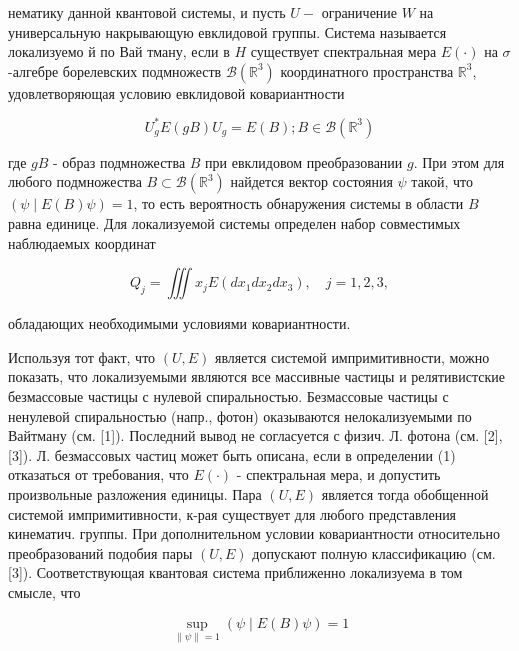 \documentclass[10pt]{article}
\begin{document}
нематику данной квантовой системы, и пусть $U-$ ограничение $W$ на универсальную накрывающую евклидовой группы. Система называется локализуемо й по Вай тману, если в $H$ существует спектральная мера $E(\cdot)$ на $\sigma$-алгебре борелевских подмножеств $\mathscr{B}\left(\mathbb{R}^{3}\right)$ координатного пространства $\mathbb{R}^{3}$, удовлетворяющая условию евклидовой ковариантности



\[

U_{g}^{*} E(g B) U_{g}=E(B) ; B \in \mathscr{B}\left(\mathbb{R}^{3}\right)

\]



где $g B$ - образ подмножества $B$ при евклидовом преобразовании $g$. При этом для любого подмножества $B \subset \mathscr{B}\left(\mathbb{R}^{3}\right)$ найдется вектор состояния $\psi$ такой, что $(\psi \mid E(B) \psi)=1$, то есть вероятность обнаружения системы в области $B$ равна единице. Для локализуемой системы определен набор совместимых наблюдаемых координат



\[

Q_{j}=\iiint x_{j} E\left(d x_{1} d x_{2} d x_{3}\right), \quad j=1,2,3,

\]



обладающих необходимыми условиями ковариантности.



Используя тот факт, что $(U, E)$ является системой импримитивности, можно показать, что локализуемыми являются все массивные частицы и релятивистские безмассовые частицы с нулевой спиральностью. Безмассовые частицы с ненулевой спиральностью (напр., фотон) оказываются нелокализуемыми по Вайтману (см. [1]). Последний вывод не согласуется с физич. Л. фотона (см. [2], [3]). Л. безмассовых частиц может быть описана, если в определении (1) отказаться от требования, что $E(\cdot)$ - спектральная мера, и допустить произвольные разложения единицы. Пара $(U, E)$ является тогда обобщенной системой импримитивности, к-рая существует для любого представления кинематич. группы. При дополнительном условии ковариантности относительно преобразований подобия пары $(U, E)$ допускают полную классификацию (см. [3]). Соответствующая квантовая система приближенно локализуема в том смысле, что



\[

\sup _{\|\psi\|=1}(\psi \mid E(B) \psi)=1

\]
\end{document}
